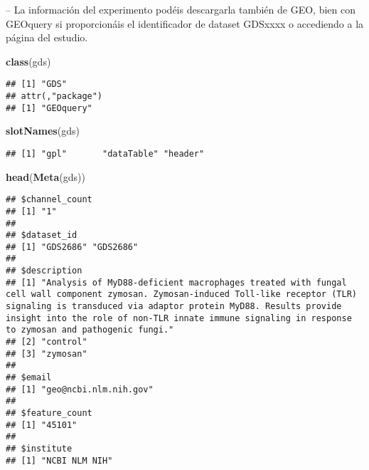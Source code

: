 \documentclass[
]{article}
\newenvironment{Shaded}{\begin{snugshade}}{\end{snugshade}}
\newcommand{\FunctionTok}[1]{\textcolor[rgb]{0.13,0.29,0.53}{\textbf{#1}}}
\newcommand{\NormalTok}[1]{#1}
\begin{document}
-- La información del experimento podéis descargarla también de GEO,
bien con GEOquery si proporcionáis el identificador de dataset GDSxxxx o
accediendo a la página del estudio.

\begin{Shaded}
\begin{Highlighting}[]
\FunctionTok{class}\NormalTok{(gds)}
\end{Highlighting}
\end{Shaded}

\begin{verbatim}
## [1] "GDS"
## attr(,"package")
## [1] "GEOquery"
\end{verbatim}

\begin{Shaded}
\begin{Highlighting}[]
\FunctionTok{slotNames}\NormalTok{(gds)}
\end{Highlighting}
\end{Shaded}

\begin{verbatim}
## [1] "gpl"       "dataTable" "header"
\end{verbatim}

\begin{Shaded}
\begin{Highlighting}[]
\FunctionTok{head}\NormalTok{(}\FunctionTok{Meta}\NormalTok{(gds))}
\end{Highlighting}
\end{Shaded}

\begin{verbatim}
## $channel_count
## [1] "1"
## 
## $dataset_id
## [1] "GDS2686" "GDS2686"
## 
## $description
## [1] "Analysis of MyD88-deficient macrophages treated with fungal cell wall component zymosan. Zymosan-induced Toll-like receptor (TLR) signaling is transduced via adaptor protein MyD88. Results provide insight into the role of non-TLR innate immune signaling in response to zymosan and pathogenic fungi."
## [2] "control"                                                                                                                                                                                                                                                                                                   
## [3] "zymosan"                                                                                                                                                                                                                                                                                                   
## 
## $email
## [1] "geo@ncbi.nlm.nih.gov"
## 
## $feature_count
## [1] "45101"
## 
## $institute
## [1] "NCBI NLM NIH"
\end{verbatim}
\end{document}
